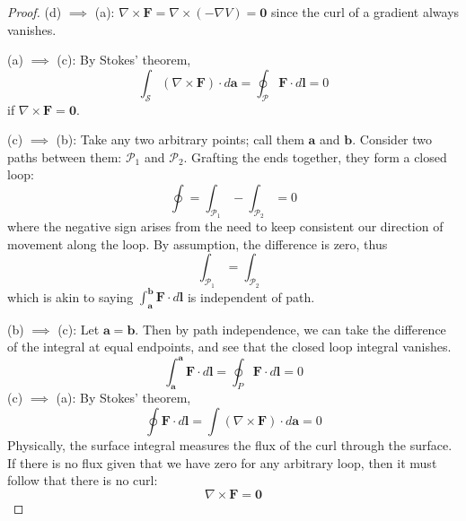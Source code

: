 \documentclass[a4paper]{article}
\begin{document}
\begin{proof}[Proof]
(d) \( \implies \) (a): \( \nabla \times \pmb{F} = \nabla \times \!\left( -\nabla V \right) = \pmb{0} \) since the curl of a gradient always vanishes.

(a) \( \implies \) (c): By Stokes' theorem,
\[
	\int_{\mathcal{S}}\!\left( \nabla \times \pmb{F} \right) \cdot d \pmb{a} = \oint_{\mathcal{P}}\pmb{F}\cdot d \pmb{l} = 0 
\]
if \( \nabla \times \pmb{F} = \pmb{0} \).

(c) \( \implies \) (b): Take any two arbitrary points; call them \( \pmb{a} \) and \( \pmb{b} \). Consider two paths between them: \( \mathcal{P}_{1} \) and \( \mathcal{P}_{2} \). Grafting the ends together, they form a closed loop:
\[
	\oint = \int_{\mathcal{P}_{1}} - \int_{\mathcal{P}_{2}} = 0
\]
where the negative sign arises from the need to keep consistent our direction of movement along the loop. By assumption, the difference is zero, thus
\[
	\int_{\mathcal{P}_{1}} = \int_{\mathcal{P}_{2}} 
\]
which is akin to saying \( \displaystyle{\int^{\pmb{b}}_{\pmb{a}} \pmb{F} \cdot d \pmb{l} } \) is independent of path.

(b) \( \implies \) (c): Let \( \pmb{a} = \pmb{b} \). Then by path independence, we can take the difference of the integral at equal endpoints, and see that the closed loop integral vanishes.
\[
	\int^{\pmb{a}}_{\pmb{a}} \pmb{F} \cdot d \pmb{l} = \oint_{P} \pmb{F} \cdot d \pmb{l} = 0   
\]
(c) \( \implies \) (a): By Stokes' theorem,
\[
	\oint \pmb{F} \cdot d \pmb{l} = \int \!\left( \nabla \times \pmb{F} \right) \cdot d \pmb{a} = 0 
\]
Physically, the surface integral measures the flux of the curl through the surface. If there is no flux given that we have zero for any arbitrary loop, then it must follow that there is no curl:
\[
	\nabla \times \pmb{F} = \pmb{0} 
\]
\end{proof}

\end{document}

